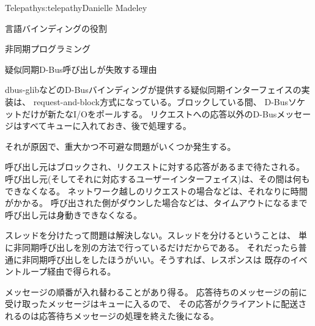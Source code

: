 \begin{aosachapter}{Telepathy}{s:telepathy}{Danielle Madeley}
\begin{aosasect1}{言語バインディングの役割}
\begin{aosasect2}{非同期プログラミング}
\begin{aosabox}{疑似同期D-Bus呼び出しが失敗する理由}

dbus-glibなどのD-Busバインディングが提供する疑似同期インターフェイスの実装は、
request-and-block方式になっている。ブロックしている間、
D-Busソケットだけが新たなI/Oをポールする。
リクエストへの応答以外のD-Busメッセージはすべてキューに入れておき、後で処理する。

それが原因で、重大かつ不可避な問題がいくつか発生する。

\begin{aosaitemize}

  \item 呼び出し元はブロックされ、リクエストに対する応答があるまで待たされる。
  呼び出し元(そしてそれに対応するユーザーインターフェイス)は、その間は何もできなくなる。
  ネットワーク越しのリクエストの場合などは、それなりに時間がかかる。
  呼び出された側がダウンした場合などは、タイムアウトになるまで呼び出し元は身動きできなくなる。

    スレッドを分けたって問題は解決しない。スレッドを分けるということは、
    単に非同期呼び出しを別の方法で行っているだけだからである。
    それだったら普通に非同期呼び出しをしたほうがいい。そうすれば、レスポンスは
    既存のイベントループ経由で得られる。

  \item メッセージの順番が入れ替わることがあり得る。
  応答待ちのメッセージの前に受け取ったメッセージはキューに入るので、
  その応答がクライアントに配送されるのは応答待ちメッセージの処理を終えた後になる。


\end{aosaitemize}
\end{aosabox}
\end{aosasect2}
\end{aosasect1}
\end{aosachapter}
